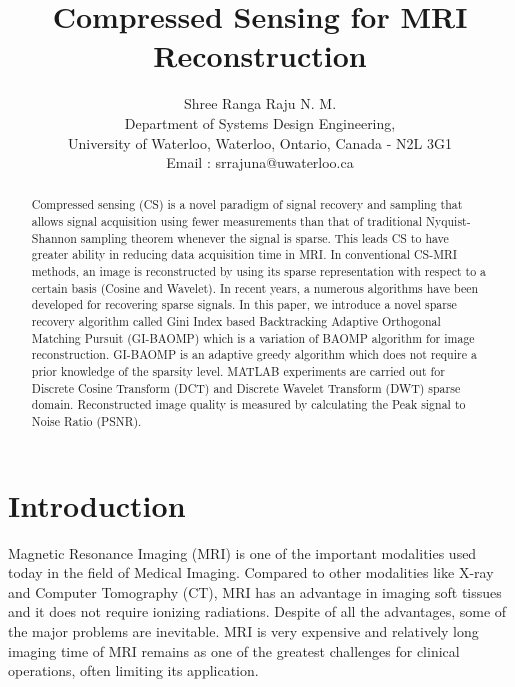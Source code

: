 \documentclass[11pt,conference]{IEEEtran}
\title{Compressed Sensing for MRI Reconstruction}
\author{Shree Ranga Raju N. M.\\
Department of Systems Design Engineering, \\
University of Waterloo, Waterloo, Ontario, Canada - N2L 3G1 \\
Email : srrajuna@uwaterloo.ca}
\begin{document}
\maketitle

\begin{abstract}
Compressed sensing (CS) is a novel paradigm of signal recovery and sampling that allows signal acquisition using fewer measurements than that of traditional Nyquist-Shannon sampling theorem whenever the signal is sparse. This leads CS to have greater ability in reducing data acquisition time in MRI. In conventional CS-MRI methods, an image is reconstructed by using its sparse representation with respect to a certain basis (Cosine and Wavelet). In recent years, a numerous algorithms have been developed for recovering sparse signals. In this paper, we introduce a novel sparse recovery algorithm called Gini Index based Backtracking Adaptive Orthogonal Matching Pursuit (GI-BAOMP) which is a variation of BAOMP algorithm for image reconstruction. GI-BAOMP is an adaptive greedy algorithm which does not require a prior knowledge of the sparsity level. MATLAB experiments are carried out for Discrete Cosine Transform (DCT) and Discrete Wavelet Transform (DWT) sparse domain. Reconstructed image quality is measured by calculating the Peak signal to Noise Ratio (PSNR).
\end{abstract}

\section{Introduction}
Magnetic Resonance Imaging (MRI) is one of the important modalities used today in the field of Medical Imaging. Compared to other modalities like X-ray and Computer Tomography (CT), MRI has an advantage in imaging soft tissues and it does not require ionizing radiations. Despite of all the advantages, some of the major problems are inevitable. MRI is very expensive and relatively long imaging time of MRI remains as one of the greatest challenges for clinical operations, often limiting its application. 
\end{document}
